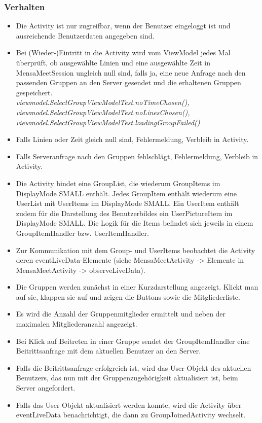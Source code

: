 \documentclass[a4paper]{scrreprt}
\begin{document}
\subsubsection{Verhalten}
\begin{itemize}
\item Die Activity ist nur zugreifbar, wenn der Benutzer eingeloggt ist und ausreichende Benutzerdaten angegeben sind.
\item Bei (Wieder-)Eintritt in die Activity wird vom ViewModel jedes Mal überprüft, ob ausgewählte Linien und eine ausgewählte Zeit in MensaMeetSession ungleich null sind, falls ja, eine neue Anfrage nach den passenden Gruppen an den Server gesendet und die erhaltenen Gruppen gespeichert. \\
\textit{viewmodel.SelectGroupViewModelTest.noTimeChosen(),
viewmodel.SelectGroupViewModelTest.noLinesChosen(),
viewmodel.SelectGroupViewModelTest.loadingGroupFailed()}
\item Falls Linien oder Zeit gleich null sind, Fehlermeldung, Verbleib in Activity.
\item Falls Serveranfrage nach den Gruppen fehlschlägt, Fehlermeldung, Verbleib in Activity.
\item Die Activity bindet eine GroupList, die wiederum GroupItems im DisplayMode SMALL enthält. Jedes GroupItem enthält wiederum eine UserList mit UserItems im DisplayMode SMALL. Ein UserItem enthält zudem für die Darstellung des Benutzerbildes ein UserPictureItem im DisplayMode SMALL. Die Logik für die Items befindet sich jeweils in einem GroupItemHandler bzw. UserItemHandler.
\item Zur Kommunikation mit dem Group- und UserItems beobachtet die Activity deren eventLiveData-Elemente (siehe MensaMeetActivity -> Elemente in MensaMeetActivity -> observeLiveData).
\item Die Gruppen werden zunächst in einer Kurzdarstellung angezeigt. Klickt man auf sie, klappen sie auf und zeigen die Buttons sowie die Mitgliederliste.
\item Es wird die Anzahl der Gruppenmitglieder ermittelt und neben der maximalen Mitgliederanzahl angezeigt.
\item Bei Klick auf Beitreten in einer Gruppe sendet der GroupItemHandler eine Beitrittsanfrage mit dem aktuellen Benutzer an den Server.  
\item Falls die Beitrittsanfrage erfolgreich ist, wird das User-Objekt des aktuellen Benutzers, das nun mit der Gruppenzugehörigkeit aktualisiert ist, beim Server angefordert. 
\item Falls das User-Objekt aktualisiert werden konnte, wird die Activity über eventLiveData benachrichtigt, die dann zu GroupJoinedActivity wechselt.

\end{itemize}
\end{document}
